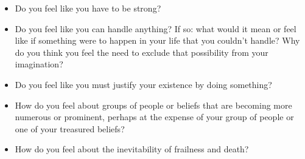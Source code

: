\documentclass[12pt,letterpaper]{book}
\begin{document}
\begin{itemize}
    \item Do you feel like you have to be strong?
    \item Do you feel like you can handle anything? If so: what would it mean or feel like if something were to happen in your life that you couldn't handle? Why do you think you feel the need to exclude that possibility from your imagination?
    \item Do you feel like you must justify your existence by doing something?
    \item How do you feel about groups of people or beliefs that are becoming more numerous or prominent, perhaps at the expense of your group of people or one of your treasured beliefs?
    \item How do you feel about the inevitability of frailness and death?
\end{itemize}
\end{document}
